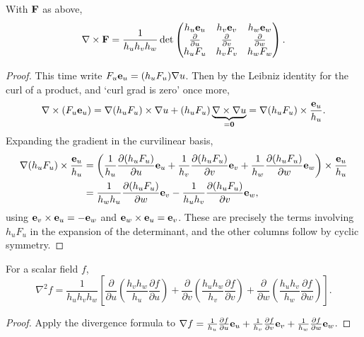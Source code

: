 \documentclass[a4paper]{scrartcl}
\begin{document}
\begin{proposition}
	With $\mathbf{F}$ as above,
	$$
	\nabla \times \mathbf{F} = \frac{1}{h_u h_v h_w} \det \begin{pmatrix}
		h_u \mathbf{e}_u & h_v \mathbf{e}_v & h_w \mathbf{e}_w \\
		\frac{\partial}{\partial u} & \frac{\partial}{\partial v} & \frac{\partial}{\partial w} \\
		h_u F_u & h_v F_v & h_w F_w
	\end{pmatrix}.
	$$
\end{proposition}
\begin{proof}
	This time write $F_u \mathbf{e}_u = (h_u F_u) \nabla u$. Then by the Leibniz identity for the curl of a product, and `curl grad is zero' once more,
	$$
	\nabla \times (F_u \mathbf{e}_u) = \nabla (h_u F_u) \times \nabla u + (h_u F_u) \underbrace{\nabla \times \nabla u}_{= \mathbf{0}} = \nabla(h_u F_u) \times \frac{\mathbf{e}_u}{h_u}.
	$$
	Expanding the gradient in the curvilinear basis,
	\begin{align*}
		\nabla(h_u F_u) \times \frac{\mathbf{e}_u}{h_u} &= \left(\frac{1}{h_u}\frac{\partial (h_u F_u)}{\partial u} \mathbf{e}_u + \frac{1}{h_v}\frac{\partial (h_u F_u)}{\partial v} \mathbf{e}_v + \frac{1}{h_w}\frac{\partial (h_u F_u)}{\partial w} \mathbf{e}_w\right) \times \frac{\mathbf{e}_u}{h_u} \\
		&= \frac{1}{h_w h_u} \frac{\partial(h_u F_u)}{\partial w} \mathbf{e}_v - \frac{1}{h_u h_v} \frac{\partial (h_u F_u)}{\partial v} \mathbf{e}_w,
	\end{align*}
	using $\mathbf{e}_v \times \mathbf{e}_u = -\mathbf{e}_w$ and $\mathbf{e}_w \times \mathbf{e}_u = \mathbf{e}_v$. These are precisely the terms involving $h_u F_u$ in the expansion of the determinant, and the other columns follow by cyclic symmetry.
\end{proof}

\begin{corollary}
	For a scalar field $f$,
	$$
	\nabla^2 f = \frac{1}{h_u h_v h_w}\left[\frac{\partial}{\partial u}\left(\frac{h_v h_w}{h_u} \frac{\partial f}{\partial u}\right) + \frac{\partial}{\partial v}\left(\frac{h_u h_w}{h_v} \frac{\partial f}{\partial v}\right) + \frac{\partial}{\partial w}\left(\frac{h_u h_v}{h_w} \frac{\partial f}{\partial w}\right)\right].
	$$
\end{corollary}
\begin{proof}
	Apply the divergence formula to $\nabla f = \frac{1}{h_u}\frac{\partial f}{\partial u} \mathbf{e}_u + \frac{1}{h_v}\frac{\partial f}{\partial v} \mathbf{e}_v + \frac{1}{h_w}\frac{\partial f}{\partial w} \mathbf{e}_w$.
\end{proof}
\end{document}
